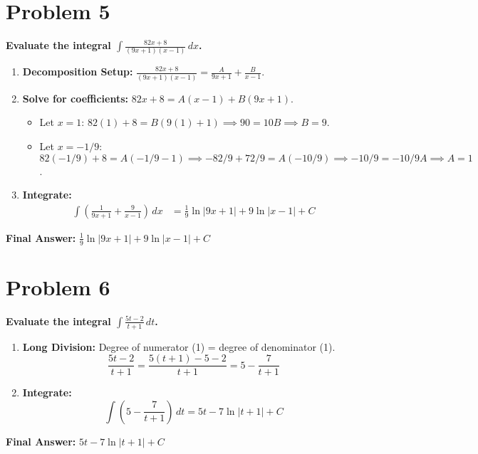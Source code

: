 \documentclass{article}
\begin{document}
\section{Problem 5}
\textbf{Evaluate the integral $\displaystyle\int \frac{82x+8}{(9x+1)(x-1)} \,dx$.}
\begin{enumerate}
    \item \textbf{Decomposition Setup:} $\displaystyle\frac{82x+8}{(9x+1)(x-1)} = \frac{A}{9x+1} + \frac{B}{x-1}$.
    \item \textbf{Solve for coefficients:} $82x+8 = A(x-1) + B(9x+1)$.
    \begin{itemize}
        \item Let $x=1$: $82(1)+8 = B(9(1)+1) \implies 90 = 10B \implies B=9$.
        \item Let $x=-1/9$: $82(-1/9)+8 = A(-1/9-1) \implies -82/9+72/9 = A(-10/9) \implies -10/9 = -10/9 A \implies A=1$.
    \end{itemize}
    \item \textbf{Integrate:}
    \begin{align*}
    \int \left( \frac{1}{9x+1} + \frac{9}{x-1} \right) \,dx &= \frac{1}{9}\ln|9x+1| + 9\ln|x-1| + C
    \end{align*}
\end{enumerate}
\textbf{Final Answer:} $\displaystyle\frac{1}{9}\ln|9x+1| + 9\ln|x-1| + C$

\section{Problem 6}
\textbf{Evaluate the integral $\displaystyle\int \frac{5t-2}{t+1} \,dt$.}
\begin{enumerate}
    \item \textbf{Long Division:} Degree of numerator (1) = degree of denominator (1).
    \[ \frac{5t-2}{t+1} = \frac{5(t+1) - 5 - 2}{t+1} = 5 - \frac{7}{t+1} \]
    \item \textbf{Integrate:}
    \[ \int \left( 5 - \frac{7}{t+1} \right) \,dt = 5t - 7\ln|t+1| + C \]
\end{enumerate}
\textbf{Final Answer:} $5t - 7\ln|t+1| + C$
\end{document}

